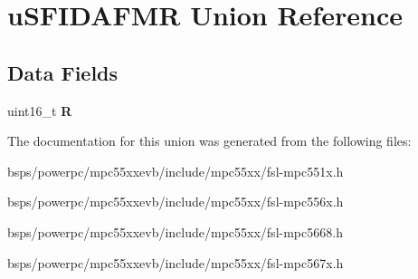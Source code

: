 \hypertarget{unionuSFIDAFMR}{}\section{u\+S\+F\+I\+D\+A\+F\+MR Union Reference}
\label{unionuSFIDAFMR}
\subsection*{Data Fields}
\begin{DoxyCompactItemize}
\item 
\mbox{\label{unionuSFIDAFMR_a75cb20c66d0d733f7ad20c6619923bd8}} 
uint16\+\_\+t {\bfseries R}
\end{DoxyCompactItemize}


The documentation for this union was generated from the following files\+:\begin{DoxyCompactItemize}
\item 
bsps/powerpc/mpc55xxevb/include/mpc55xx/fsl-\/mpc551x.\+h\item 
bsps/powerpc/mpc55xxevb/include/mpc55xx/fsl-\/mpc556x.\+h\item 
bsps/powerpc/mpc55xxevb/include/mpc55xx/fsl-\/mpc5668.\+h\item 
bsps/powerpc/mpc55xxevb/include/mpc55xx/fsl-\/mpc567x.\+h\end{DoxyCompactItemize}
